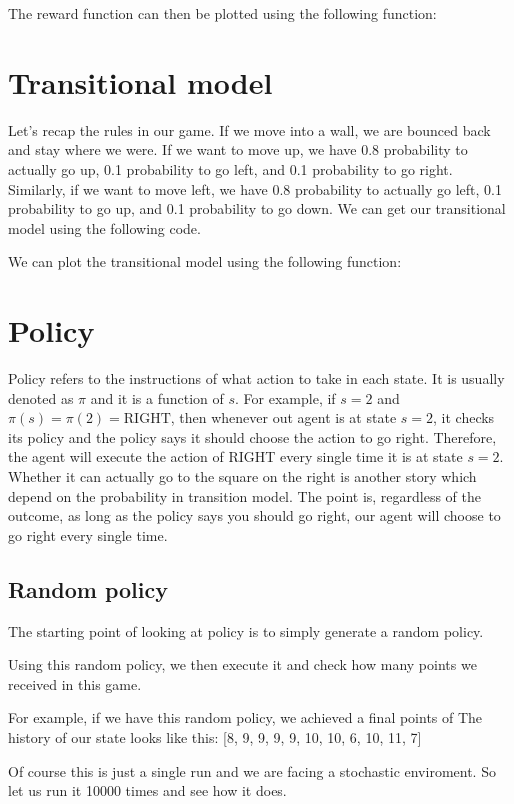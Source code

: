 \documentclass[
	letterpaper
]{article}
\begin{document}
The reward function can then be plotted using the following function:

\section{Transitional model}
Let's recap the rules in our game.
If we move into a wall, we are bounced back and stay where we were.
If we want to move up, we have 0.8 probability to actually go up, 0.1 probability to go left, and 0.1 probability to go right.
Similarly, if we want  to move left, we have 0.8 probability to actually go left, 0.1 probability to go up, and 0.1 probability to go down.
We can get our transitional model using the following code.

We can plot the transitional model using the following function:


\section{Policy}
Policy refers to the instructions of what action to take in each state.
It is usually denoted as $\pi$ and it is a function of $s$.
For example, if $s = 2$ and $\pi(s) = \pi(2) = \text{RIGHT}$, then whenever out agent is at state $s = 2$, it checks its policy and the policy says it should choose the action to go right.
Therefore, the agent will execute the action of RIGHT every single time it is at state $s = 2$.
Whether it can actually go to the square on the right is another story which depend on the probability in transition model.
The point is, regardless of the outcome, as long as the policy says you should go right, our agent will choose to go right every single time.

\subsection{Random policy}
The starting point of looking at policy is to simply generate a random policy.

Using this random policy, we then execute it and check how many points we received in this game.

For example, if we have this random policy, we achieved a final points of 
The history of our state looks like this:
[8, 9, 9, 9, 9, 10, 10, 6, 10, 11, 7]

Of course this is just a single run and we are facing a stochastic enviroment.
So let us run it 10000 times and see how it does.
\end{document}
